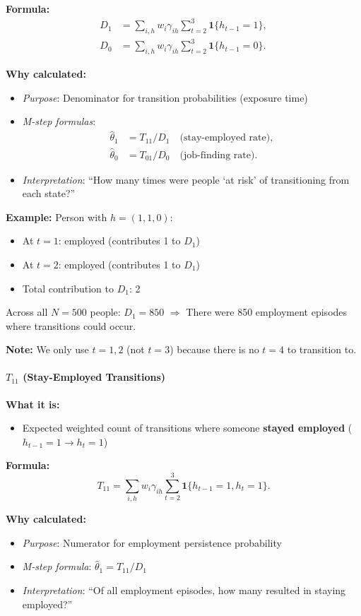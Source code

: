 \documentclass[12pt]{article}
\begin{document}
\textbf{Formula:}
\begin{align*}
D_1 &= \sum_{i,h} w_i\gamma_{ih}\sum_{t=2}^3\mathbf{1}\{h_{t-1}=1\},\\
D_0 &= \sum_{i,h} w_i\gamma_{ih}\sum_{t=2}^3\mathbf{1}\{h_{t-1}=0\}.
\end{align*}

\textbf{Why calculated:}
\begin{itemize}
\item \emph{Purpose}: Denominator for transition probabilities (exposure time)
\item \emph{M-step formulas}: 
  \begin{align*}
  \hat{\theta}_1 &= T_{11} / D_1 \quad\text{(stay-employed rate)},\\
  \hat{\theta}_0 &= T_{01} / D_0 \quad\text{(job-finding rate)}.
  \end{align*}
\item \emph{Interpretation}: ``How many times were people `at risk' of transitioning from each state?''
\end{itemize}

\textbf{Example:}
Person with $h = (1,1,0)$:
\begin{itemize}
\item At $t=1$: employed (contributes 1 to $D_1$)
\item At $t=2$: employed (contributes 1 to $D_1$)
\item Total contribution to $D_1$: 2
\end{itemize}
Across all $N=500$ people: $D_1 = 850$ $\Rightarrow$ There were 850 employment episodes where transitions could occur.

\textbf{Note:} We only use $t=1,2$ (not $t=3$) because there is no $t=4$ to transition to.

\paragraph{$T_{11}$ (Stay-Employed Transitions)}

\textbf{What it is:}
\begin{itemize}
\item Expected weighted count of transitions where someone \textbf{stayed employed} ($h_{t-1} = 1 \to h_t = 1$)
\end{itemize}

\textbf{Formula:}
\[
T_{11} = \sum_{i,h} w_i\gamma_{ih}\sum_{t=2}^3\mathbf{1}\{h_{t-1}=1, h_t=1\}.
\]

\textbf{Why calculated:}
\begin{itemize}
\item \emph{Purpose}: Numerator for employment persistence probability
\item \emph{M-step formula}: $\hat{\theta}_1 = T_{11} / D_1$
\item \emph{Interpretation}: ``Of all employment episodes, how many resulted in staying employed?''
\end{itemize}
\end{document}
